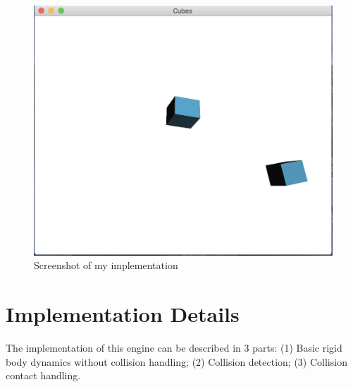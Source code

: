 \documentclass[acmtog]{acmart}
\begin{document}
	\begin{figure}[H]
		\centering
		\includegraphics[scale=0.2]{sc1.png}
		\caption{Screenshot of my implementation}
	\end{figure}

\section{Implementation Details}
The implementation of this engine can be described in 3 parts: (1) Basic rigid body dynamics without 
collision handling; (2) Collision detection; (3) Collision contact handling.
\end{document}
